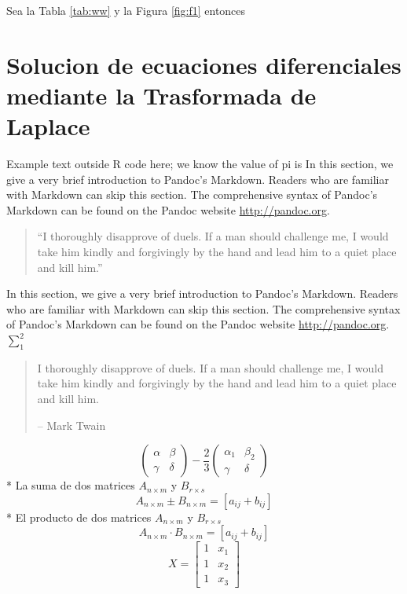 \documentclass[10pt,]{krantz}
\theoremstyle{definition}
\theoremstyle{definition}
\theoremstyle{definition}
\theoremstyle{remark}
\begin{document}
Sea la Tabla \ref{tab:ww} y la Figura \ref{fig:f1} entonces

\hypertarget{solucion-de-ecuaciones-diferenciales-mediante-la-trasformada-de-laplace}{%
\chapter{Solucion de ecuaciones diferenciales mediante la Trasformada de Laplace}\label{solucion-de-ecuaciones-diferenciales-mediante-la-trasformada-de-laplace}}

Example text outside R code here; we know the value of
pi is In this section, we give a very brief introduction to Pandoc's Markdown. Readers who are familiar with Markdown can skip this section. The comprehensive syntax of Pandoc's Markdown can be found on the Pandoc website \url{http://pandoc.org}.

\begin{quote}
``I thoroughly disapprove of duels. If a man should challenge me,
I would take him kindly and forgivingly by the hand and lead him
to a quiet place and kill him.''
\end{quote}

In this section, we give a very brief introduction to Pandoc's Markdown. Readers who are familiar with Markdown can skip this section. The comprehensive syntax of Pandoc's Markdown can be found on the Pandoc website \url{http://pandoc.org}. \(\sum_1^2\)

\begin{quote}
I thoroughly disapprove of duels. If a man should challenge me,
I would take him kindly and forgivingly by the hand and lead him
to a quiet place and kill him.

-- Mark Twain
\end{quote}

\[\begin{pmatrix}\alpha & \beta\\
\gamma & \delta
\end{pmatrix}-\frac{2}{3} \begin{pmatrix}\alpha_1 & \beta_2\\
\gamma & \delta
\end{pmatrix}\]
* La suma de dos matrices \(A_{n\times m}\) y \(B_{r\times s}\) \[A_{n\times m}\pm B_{n\times m}=[a_{ij}+b_{ij}]\]
* El producto de dos matrices \(A_{n\times m}\) y \(B_{r\times s}\) \[A_{n\times m}\cdot B_{n\times m}=[a_{ij}+b_{ij}]\]
\[X = \begin{bmatrix}1 & x_{1}\\
1 & x_{2}\\
1 & x_{3}
\end{bmatrix}\]
\end{document}
